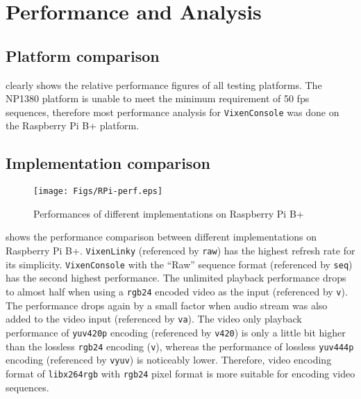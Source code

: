 \chapter{Performance and Analysis}
\renewcommand{\baselinestretch}{\mystretch}
\label{chap:Perf}

\section{Platform comparison}

 clearly shows the relative performance figures of all testing platforms. The NP1380 platform is unable to meet the minimum requirement of 50 fps sequences, therefore most performance analysis for \texttt{VixenConsole} was done on the Raspberry Pi B+ platform.

\section{Implementation comparison}

\begin{figure}[t]
  \centering
  \texttt{[image: Figs/RPi-perf.eps]}
  \caption{\footnotesize Performances of different implementations on Raspberry Pi B+}
  \label{fig:perf-RPi}
\end{figure}

 shows the performance comparison between different implementations on Raspberry Pi B+. \texttt{VixenLinky} (referenced by \texttt{raw}) has the highest refresh rate for its simplicity. \texttt{VixenConsole} with the ``Raw'' sequence format (referenced by \texttt{seq}) has the second highest performance. The unlimited playback performance drops to almost half when using a \texttt{rgb24} encoded video as the input (referenced by \texttt{v}). The performance drops again by a small factor when audio stream was also added to the video input (referenced by \texttt{va}). The video only playback performance of \texttt{yuv420p} encoding (referenced by \texttt{v420}) is only a little bit higher than the lossless \texttt{rgb24} encoding (\texttt{v}), whereas the performance of lossless \texttt{yuv444p} encoding (referenced by \texttt{vyuv}) is noticeably lower. Therefore, video encoding format of \texttt{libx264rgb} with \texttt{rgb24} pixel format is more suitable for encoding video sequences.


